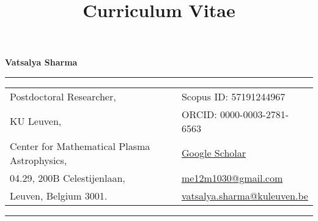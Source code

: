 \documentclass[a4paper,skipsamekey,11pt,english]{curve}
\title{Curriculum Vitae}
\begin{document}
\noindent \LARGE{\textbf{Vatsalya Sharma}}
\vspace{+1ex}
\hrule
\vspace{+2ex} 
\normalsize 
\begin{minipage}[t]{0.7\textwidth} %
\flushright
\begin{tabular}{l  | l }
 Postdoctoral Researcher, &   Scopus ID: 57191244967 \\
 KU Leuven,  &      ORCID: 0000-0003-2781-6563 \\
 Center for Mathematical Plasma Astrophysics,  &      \href{https://scholar.google.com/citations?user=lXGrvLoAAAAJ&hl=en}{Google Scholar} \\
 04.29, 200B Celestijenlaan,          &        \href{mailto:me12m1030@gmail.com}{me12m1030@gmail.com}  \\
 Leuven, Belgium 3001.  &      \href{mailto:vatsalya.sharma@kuleuven.be}{vatsalya.sharma@kuleuven.be}
\end{tabular}
\end{minipage}
\vspace{+1ex}
\hrule
\vspace{+2ex} 

\newpage
{}



\end{document}
